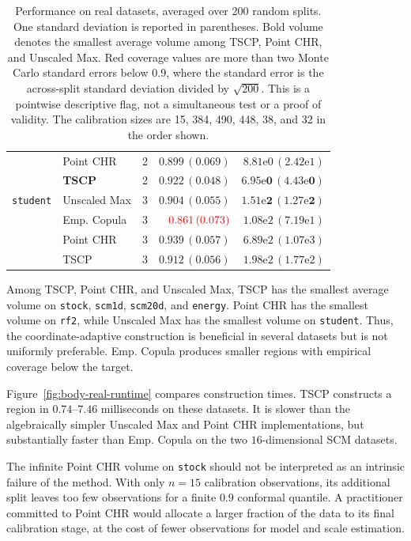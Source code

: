 \begin{table}[!htbp]
\begin{tabular}{llrrr}
 & Point CHR & 2 & $0.899\,(0.069)$ & $8.81\mathrm{e}{0}\,(2.42\mathrm{e}{1})$ \\
 & \textbf{TSCP} & 2 & $0.922\,(0.048)$ & $\mathbf{6.95\mathrm{e}{0}\,(4.43\mathrm{e}{0})}$ \\
\addlinespace
\texttt{student} & Unscaled Max & 3 & $0.904\,(0.055)$ & $\mathbf{1.51\mathrm{e}{2}\,(1.27\mathrm{e}{2})}$ \\
 & Emp. Copula & 3 & ${\color{red}0.861\,(0.073)}$ & $1.08\mathrm{e}{2}\,(7.19\mathrm{e}{1})$ \\
 & Point CHR & 3 & $0.939\,(0.057)$ & $6.89\mathrm{e}{2}\,(1.07\mathrm{e}{3})$ \\
 & TSCP & 3 & $0.912\,(0.056)$ & $1.98\mathrm{e}{2}\,(1.77\mathrm{e}{2})$ \\
\bottomrule
\end{tabular}
\caption{Performance on real datasets, averaged over 200 random splits. One
standard deviation is reported in parentheses. Bold volume denotes the
smallest average volume among TSCP, Point CHR, and Unscaled Max. Red coverage
values are more than two Monte Carlo standard errors below $0.9$, where the
standard error is the across-split standard deviation divided by $\sqrt{200}$.
This is a pointwise descriptive flag, not a simultaneous test or a proof of validity.
The calibration sizes are 15, 384,
490, 448, 38, and 32 in the order shown.}
\label{tab:real-data}
\end{table}

Among TSCP, Point CHR, and Unscaled Max, TSCP has the smallest average
volume on \texttt{stock}, \texttt{scm1d}, \texttt{scm20d}, and
\texttt{energy}. Point CHR has the smallest volume on \texttt{rf2}, while
Unscaled Max has the smallest volume on \texttt{student}. Thus, the
coordinate-adaptive construction is beneficial in several datasets but is
not uniformly preferable. Emp. Copula produces smaller regions with
empirical coverage below the target.

Figure~\ref{fig:body-real-runtime} compares construction times.
TSCP constructs a region in $0.74$--$7.46$ milliseconds on
these datasets. It is slower than the algebraically simpler Unscaled Max and
Point CHR implementations, but substantially faster than Emp. Copula on the
two $16$-dimensional SCM datasets. 

The infinite Point CHR volume on \texttt{stock} should not be interpreted as
an intrinsic failure of the method. With only $n=15$ calibration observations,
its additional split leaves too few observations for a finite $0.9$ conformal
quantile. A practitioner committed to Point CHR would allocate a larger
fraction of the data to its final calibration stage, at the cost of fewer
observations for model and scale estimation.

